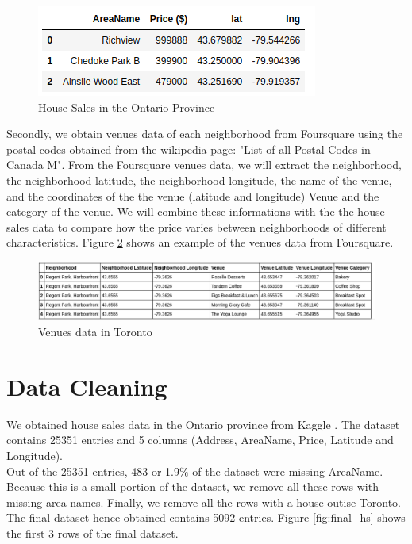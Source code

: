\documentclass{article}
\begin{document}
\begin{figure}
	
	\includegraphics[]{hs.png}
	\caption{House Sales in the Ontario Province}
	\label{fig:hs}
	
\end{figure}

Secondly, we obtain venues data of each neighborhood from Foursquare using the postal codes obtained from the wikipedia page: "List of all Postal Codes in Canada M". From the Foursquare venues data, we will extract the neighborhood, the neighborhood latitude, the neighborhood longitude, the name of the venue, and the coordinates of the the venue (latitude and longitude)	Venue and the category of the venue. We will combine these informations with the the house sales data to compare how the price varies between neighborhoods of different characteristics. Figure \ref{fig:tv} shows an example of the venues data from Foursquare.

\begin{figure}[hbt!]
	
	\includegraphics[width=\textwidth]{tv.png}
	\caption{Venues data in Toronto}
	\label{fig:tv}
	
\end{figure}

\section{Data Cleaning}

We obtained house sales data in the Ontario province from Kaggle \cite{houses_sale}. The dataset contains 25351 entries and 5 columns (Address, AreaName, Price, Latitude and Longitude). \\ 

Out of the 25351 entries, 483 or 1.9$\%$ of the dataset were missing AreaName. Because this is a small portion of the dataset, we remove all these rows with missing area names. Finally, we remove all the rows with a house outise Toronto. The final dataset hence obtained contains 5092 entries. Figure \ref{fig:final_hs} shows the first 3 rows of the final dataset. \\
\end{document}
